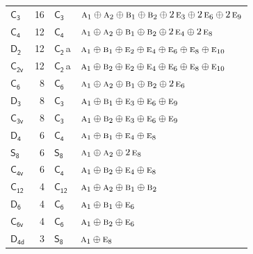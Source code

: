\documentclass[10pt,a4paper]{article}
\numberwithin{equation}{section}
\newcommand{\grp}[1]{\mathsf{#1}}
\newcommand{\irr}[1]{\text{\normalfont\scshape #1}}
\newcommand{\clsletter}[1]{\,{\scriptsize\color{black!55}#1}}
\newlength{\fillwidth}\newlength{\cellwidth}\newlength{\colwidth}
\begin{document}
{\begin{longtable}{@{}lrl>{\RaggedRight\arraybackslash}p{\fillwidth}@{}}
\href{C3.pdf}{$\grp{C_{3}}$} & 16 & \href{C3.pdf}{$\grp{C_{3}}$} & $\irr{a}_{1}\oplus \irr{a}_{2}\oplus \irr{b}_{1}\oplus \irr{b}_{2}\oplus 2\,\irr{e}_{3}\oplus 2\,\irr{e}_{6}\oplus 2\,\irr{e}_{9}$\\
\href{C4.pdf}{$\grp{C_{4}}$} & 12 & \href{C4.pdf}{$\grp{C_{4}}$} & $\irr{a}_{1}\oplus \irr{a}_{2}\oplus \irr{b}_{1}\oplus \irr{b}_{2}\oplus 2\,\irr{e}_{4}\oplus 2\,\irr{e}_{8}$\\
\href{D2.pdf}{$\grp{D_{2}}$} & 12 & \href{C2.pdf}{$\grp{C_{2}}$}\clsletter{a} & $\irr{a}_{1}\oplus \irr{b}_{1}\oplus \irr{e}_{2}\oplus \irr{e}_{4}\oplus \irr{e}_{6}\oplus \irr{e}_{8}\oplus \irr{e}_{10}$\\
\href{C2v.pdf}{$\grp{C_{2v}}$} & 12 & \href{C2.pdf}{$\grp{C_{2}}$}\clsletter{a} & $\irr{a}_{1}\oplus \irr{b}_{2}\oplus \irr{e}_{2}\oplus \irr{e}_{4}\oplus \irr{e}_{6}\oplus \irr{e}_{8}\oplus \irr{e}_{10}$\\
\href{C6.pdf}{$\grp{C_{6}}$} & 8 & \href{C6.pdf}{$\grp{C_{6}}$} & $\irr{a}_{1}\oplus \irr{a}_{2}\oplus \irr{b}_{1}\oplus \irr{b}_{2}\oplus 2\,\irr{e}_{6}$\\
\href{D3.pdf}{$\grp{D_{3}}$} & 8 & \href{C3.pdf}{$\grp{C_{3}}$} & $\irr{a}_{1}\oplus \irr{b}_{1}\oplus \irr{e}_{3}\oplus \irr{e}_{6}\oplus \irr{e}_{9}$\\
\href{C3v.pdf}{$\grp{C_{3v}}$} & 8 & \href{C3.pdf}{$\grp{C_{3}}$} & $\irr{a}_{1}\oplus \irr{b}_{2}\oplus \irr{e}_{3}\oplus \irr{e}_{6}\oplus \irr{e}_{9}$\\
\href{D4.pdf}{$\grp{D_{4}}$} & 6 & \href{C4.pdf}{$\grp{C_{4}}$} & $\irr{a}_{1}\oplus \irr{b}_{1}\oplus \irr{e}_{4}\oplus \irr{e}_{8}$\\
\href{S8.pdf}{$\grp{S_{8}}$} & 6 & \href{S8.pdf}{$\grp{S_{8}}$} & $\irr{a}_{1}\oplus \irr{a}_{2}\oplus 2\,\irr{e}_{8}$\\
\href{C4v.pdf}{$\grp{C_{4v}}$} & 6 & \href{C4.pdf}{$\grp{C_{4}}$} & $\irr{a}_{1}\oplus \irr{b}_{2}\oplus \irr{e}_{4}\oplus \irr{e}_{8}$\\
\href{C12.pdf}{$\grp{C_{12}}$} & 4 & \href{C12.pdf}{$\grp{C_{12}}$} & $\irr{a}_{1}\oplus \irr{a}_{2}\oplus \irr{b}_{1}\oplus \irr{b}_{2}$\\
\href{D6.pdf}{$\grp{D_{6}}$} & 4 & \href{C6.pdf}{$\grp{C_{6}}$} & $\irr{a}_{1}\oplus \irr{b}_{1}\oplus \irr{e}_{6}$\\
\href{C6v.pdf}{$\grp{C_{6v}}$} & 4 & \href{C6.pdf}{$\grp{C_{6}}$} & $\irr{a}_{1}\oplus \irr{b}_{2}\oplus \irr{e}_{6}$\\
\href{D4d.pdf}{$\grp{D_{4d}}$} & 3 & \href{S8.pdf}{$\grp{S_{8}}$} & $\irr{a}_{1}\oplus \irr{e}_{8}$\\

\end{longtable}}
\end{document}
